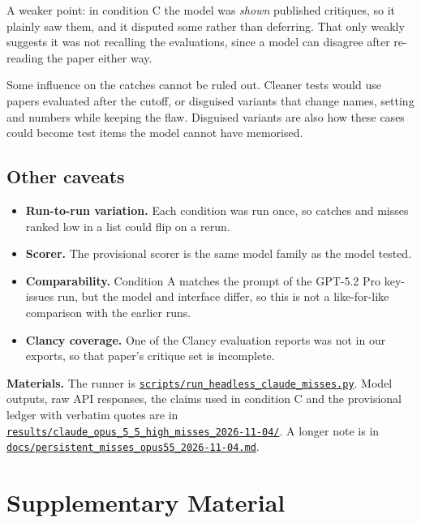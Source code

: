 \documentclass[
  11pt,
  letterpaper,
]{article}
\providecommand{\tightlist}{%
  \setlength{\itemsep}{0pt}\setlength{\parskip}{0pt}}
\begin{document}
A weaker point: in condition C the model was \emph{shown} published
critiques, so it plainly saw them, and it disputed some rather than
deferring. That only weakly suggests it was not recalling the
evaluations, since a model can disagree after re-reading the paper
either way.

Some influence on the catches cannot be ruled out. Cleaner tests would
use papers evaluated after the cutoff, or disguised variants that change
names, setting and numbers while keeping the flaw. Disguised variants
are also how these cases could become test items the model cannot have
memorised.

\subsection{Other caveats}\label{other-caveats}

\begin{itemize}
\tightlist
\item
  \textbf{Run-to-run variation.} Each condition was run once, so catches
  and misses ranked low in a list could flip on a rerun.
\item
  \textbf{Scorer.} The provisional scorer is the same model family as
  the model tested.
\item
  \textbf{Comparability.} Condition A matches the prompt of the GPT-5.2
  Pro key-issues run, but the model and interface differ, so this is not
  a like-for-like comparison with the earlier runs.
\item
  \textbf{Clancy coverage.} One of the Clancy evaluation reports was not
  in our exports, so that paper's critique set is incomplete.
\end{itemize}

\textbf{Materials.} The runner is
\href{https://github.com/valentinklotzbuecher/llm-uj-research-eval/blob/working-paper/scripts/run_headless_claude_misses.py}{\texttt{scripts/run\_headless\_claude\_misses.py}}.
Model outputs, raw API responses, the claims used in condition C and the
provisional ledger with verbatim quotes are in
\href{https://github.com/valentinklotzbuecher/llm-uj-research-eval/tree/working-paper/results/claude_opus_5_5_high_misses_2026-11-04}{\texttt{results/claude\_opus\_5\_5\_high\_misses\_2026-11-04/}}.
A longer note is in
\href{https://github.com/valentinklotzbuecher/llm-uj-research-eval/blob/working-paper/docs/persistent_misses_opus55_2026-11-04.md}{\texttt{docs/persistent\_misses\_opus55\_2026-11-04.md}}.

\section{Supplementary Material}\label{supplementary-material}
\end{document}
